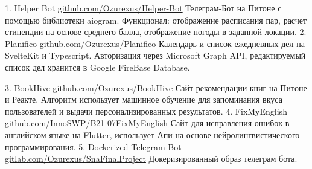 \documentclass[9pt]{developercv} %
\begin{document}
\begin{entrylist}
    \entry
		{1.}
		{Helper Bot}
            {\href{https://github.com/Ozurexus/Helper-Bot}{github.com/Ozurexus/Helper-Bot}}
		{Телеграм-Бот на Питоне с помощью библиотеки aiogram. Функционал: отображение расписания пар, расчет стипендии на основе среднего балла, отображение погоды в заданной локации.}
    \entry
		{2.}
		{Planifico}
            {\href{https://github.com/Ozurexus/Planifico}{github.com/Ozurexus/Planifico}}
		{Календарь и список ежедневных дел на SvelteKit и Typescript. Авторизация через Microsoft Graph API, редактируемый список дел хранится в Google FireBase Database.}

    \entry
		{3.}
		{BookHive}
            {\href{https://github.com/Ozurexus/BookHive}
		{github.com/Ozurexus/BookHive}}
		{Сайт рекомендации книг на Питоне и Реакте. Алгоритм использует машинное обучение для запоминания вкуса пользователей и выдачи персонализированных результатов.}
    \entry
		{4.}
		{FixMyEnglish}
            {\href{https://github.com/InnoSWP/B21-07FixMyEnglish}
		{github.com/InnoSWP/B21-07FixMyEnglish}}
		{Сайт для исправления ошибок в английском языке на Flutter, использует Апи на основе нейролингвистического программирования.}
    \entry
		{5.}
		{Dockerized Telegram Bot}
            {\href{https://gitlab.com/Ozurexus/snafinalproject_pikachubot}
		{gitlab.com/Ozurexus/SnaFinalProject}}
		{Докеризированный образ телеграм бота.}
\end{entrylist}
\end{document}
